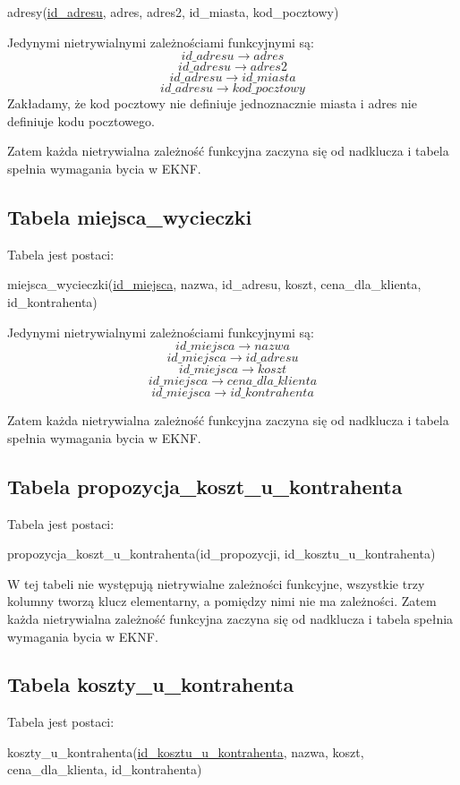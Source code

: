 \documentclass[a4paper,12pt]{mwart}
\begin{document}
adresy(\underline{id\_adresu}, adres, adres2, id\_miasta, kod\_pocztowy)

\noindent Jedynymi nietrywialnymi zależnościami funkcyjnymi są:
$$   id\_adresu  \rightarrow adres $$
$$   id\_adresu  \rightarrow adres2 $$
$$   id\_adresu  \rightarrow id\_miasta $$
$$   id\_adresu  \rightarrow kod\_pocztowy $$
Zakładamy, że kod pocztowy nie definiuje jednoznacznie miasta i  adres nie definiuje kodu pocztowego.


Zatem każda nietrywialna zależność funkcyjna zaczyna się od nadklucza i tabela  spełnia wymagania bycia w EKNF.


\subsection{Tabela miejsca\_wycieczki}
Tabela jest postaci:

miejsca\_wycieczki(\underline{id\_miejsca}, nazwa, id\_adresu, koszt, cena\_dla\_klienta, id\_kontrahenta)

\noindent Jedynymi nietrywialnymi zależnościami funkcyjnymi są:
$$   id\_miejsca  \rightarrow nazwa $$
$$   id\_miejsca  \rightarrow id\_adresu $$
$$   id\_miejsca  \rightarrow koszt $$
$$   id\_miejsca  \rightarrow cena\_dla\_klienta $$
$$   id\_miejsca  \rightarrow id\_kontrahenta $$


Zatem każda nietrywialna zależność funkcyjna zaczyna się od nadklucza i tabela  spełnia wymagania bycia w EKNF.

\subsection{Tabela propozycja\_koszt\_u\_kontrahenta}
Tabela jest postaci:

propozycja\_koszt\_u\_kontrahenta(id\_propozycji, id\_kosztu\_u\_kontrahenta)

W tej tabeli nie występują nietrywialne zależności funkcyjne, wszystkie trzy kolumny tworzą klucz elementarny, a pomiędzy nimi nie ma zależności.
Zatem każda nietrywialna zależność funkcyjna zaczyna się od nadklucza i tabela  spełnia wymagania bycia w EKNF.


\subsection{Tabela koszty\_u\_kontrahenta}
Tabela jest postaci:

koszty\_u\_kontrahenta(\underline{id\_kosztu\_u\_kontrahenta}, nazwa, koszt, cena\_dla\_klienta, id\_kontrahenta)
\end{document}
